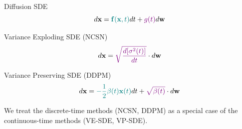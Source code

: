 \documentclass{beamer}
\begin{document}
\begin{frame}{Diffusion SDE}
	\vspace{-0.3cm}
	\[
		d\mathbf{x} = {\color{teal}\mathbf{f}(\mathbf{x}, t)} dt + {\color{violet}g(t)} d \mathbf{w}
	\]
    \eqpause
	\vspace{-0.3cm}
	\begin{block}{Variance Exploding SDE (NCSN)}
		\vspace{-0.3cm}
		\[
			d \mathbf{x} = {\color{violet}\sqrt{\frac{ d [\sigma^2(t)]}{dt}}} \cdot d \mathbf{w}
		\]
		\vspace{-0.3cm}
	\end{block}
	\begin{block}{Variance Preserving SDE (DDPM)}
		\vspace{-0.3cm}
		\[
			d \mathbf{x} = {\color{teal}- \frac{1}{2} \beta(t) \mathbf{x}(t)} dt + {\color{violet}\sqrt{\beta(t)}} \cdot d \mathbf{w}
		\]
	\end{block}
	We treat the discrete-time methods (NCSN, DDPM) as a special case of the continuous-time methods (VE-SDE, VP-SDE).
\end{frame}
\end{document}
